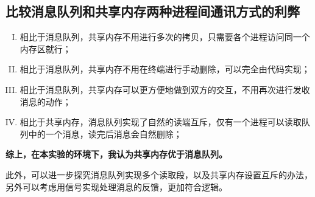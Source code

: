 \documentclass[UTF8]{ctexart}
\begin{document}
\subsection{比较消息队列和共享内存两种进程间通讯方式的利弊}
\begin{enumerate}[I.]
    \item 相比于消息队列，共享内存不用进行多次的拷贝，只需要各个进程访问同一个内存区就行；
    \item 相比于消息队列，共享内存不用在终端进行手动删除，可以完全由代码实现；
    \item 相比于消息队列，共享内存可以更方便地做到双方的交互，不用再次进行发收消息的动作；
    \item 相比于共享内存，消息队列实现了自然的读端互斥，仅有一个进程可以读取队列中的一个消息，读完后消息会自然删除；
\end{enumerate}\par 
\textbf{综上，在本实验的环境下，我认为共享内存优于消息队列。}\par 
此外，可以进一步探究消息队列实现多个读取段，以及共享内存设置互斥的办法，另外可以考虑用信号实现处理消息的反馈，更加符合逻辑。
\end{document}
